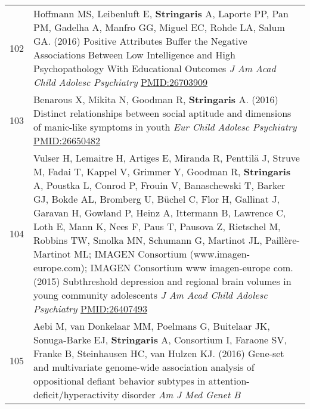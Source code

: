 \documentclass[
]{article}
\begin{document}
\begin{longtable}[]{@{}ll@{}}
\begin{minipage}[t]{0.01\columnwidth}
102\strut
\end{minipage} & \begin{minipage}[t]{0.94\columnwidth}\raggedright
Hoffmann MS, Leibenluft E, \textbf{Stringaris} A, Laporte PP, Pan PM,
Gadelha A, Manfro GG, Miguel EC, Rohde LA, Salum GA. (2016) Positive
Attributes Buffer the Negative Associations Between Low Intelligence and
High Psychopathology With Educational Outcomes \emph{J Am Acad Child
Adolesc Psychiatry} \url{PMID:26703909}\strut
\end{minipage}\tabularnewline
\begin{minipage}[t]{0.01\columnwidth}\raggedright
103\strut
\end{minipage} & \begin{minipage}[t]{0.94\columnwidth}\raggedright
Benarous X, Mikita N, Goodman R, \textbf{Stringaris} A. (2016) Distinct
relationships between social aptitude and dimensions of manic-like
symptoms in youth \emph{Eur Child Adolesc Psychiatry}
\url{PMID:26650482}\strut
\end{minipage}\tabularnewline
\begin{minipage}[t]{0.01\columnwidth}\raggedright
104\strut
\end{minipage} & \begin{minipage}[t]{0.94\columnwidth}\raggedright
Vulser H, Lemaitre H, Artiges E, Miranda R, Penttilä J, Struve M, Fadai
T, Kappel V, Grimmer Y, Goodman R, \textbf{Stringaris} A, Poustka L,
Conrod P, Frouin V, Banaschewski T, Barker GJ, Bokde AL, Bromberg U,
Büchel C, Flor H, Gallinat J, Garavan H, Gowland P, Heinz A, Ittermann
B, Lawrence C, Loth E, Mann K, Nees F, Paus T, Pausova Z, Rietschel M,
Robbins TW, Smolka MN, Schumann G, Martinot JL, Paillère-Martinot ML;
IMAGEN Consortium (www.imagen-europe.com); IMAGEN Consortium www
imagen-europe com. (2015) Subthreshold depression and regional brain
volumes in young community adolescents \emph{J Am Acad Child Adolesc
Psychiatry} \url{PMID:26407493}\strut
\end{minipage}\tabularnewline
\begin{minipage}[t]{0.01\columnwidth}\raggedright
105\strut
\end{minipage} & \begin{minipage}[t]{0.94\columnwidth}\raggedright
Aebi M, van Donkelaar MM, Poelmans G, Buitelaar JK, Sonuga-Barke EJ,
\textbf{Stringaris} A, Consortium I, Faraone SV, Franke B, Steinhausen
HC, van Hulzen KJ. (2016) Gene-set and multivariate genome-wide
association analysis of oppositional defiant behavior subtypes in
attention-deficit/hyperactivity disorder \emph{Am J Med Genet B
}
\end{minipage}
\end{longtable}
\end{document}
